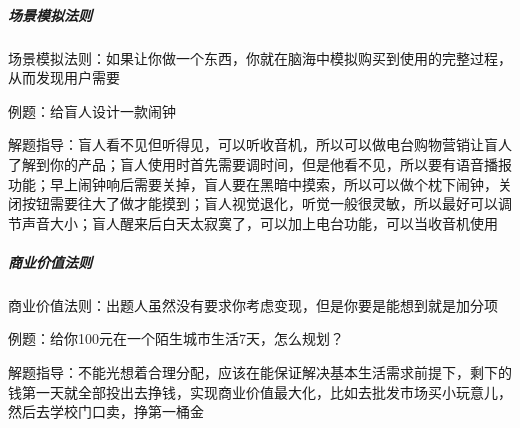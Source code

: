 \documentclass[letterpaper,11pt,english]{sphinxmanual}
\begin{document}
\subparagraph{场景模拟法则}
\label{\detokenize{chapter_interview/exam:id12}}
场景模拟法则：如果让你做一个东西，你就在脑海中模拟购买到使用的完整过程，从而发现用户需要

例题：给盲人设计一款闹钟

解题指导：盲人看不见但听得见，可以听收音机，所以可以做电台购物营销让盲人了解到你的产品；盲人使用时首先需要调时间，但是他看不见，所以要有语音播报功能；早上闹钟响后需要关掉，盲人要在黑暗中摸索，所以可以做个枕下闹钟，关闭按钮需要往大了做才能摸到；盲人视觉退化，听觉一般很灵敏，所以最好可以调节声音大小；盲人醒来后白天太寂寞了，可以加上电台功能，可以当收音机使用


\subparagraph{商业价值法则}
\label{\detokenize{chapter_interview/exam:id13}}
商业价值法则：出题人虽然没有要求你考虑变现，但是你要是能想到就是加分项

例题：给你100元在一个陌生城市生活7天，怎么规划？

解题指导：不能光想着合理分配，应该在能保证解决基本生活需求前提下，剩下的钱第一天就全部投出去挣钱，实现商业价值最大化，比如去批发市场买小玩意儿，然后去学校门口卖，挣第一桶金
\end{document}
